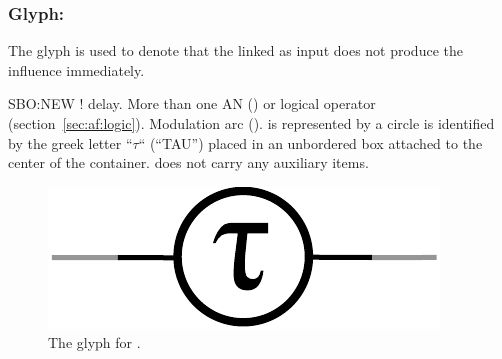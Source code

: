 \color{red}
\subsubsection{Glyph: }\label{sec:delay}

The glyph  is used to denote that the  linked as input does not produce the influence immediately.

\begin{glyphDescription}
 \glyphSboTerm SBO:NEW ! delay.
 \glyphOrigin More than one AN () or logical operator (section~\ref{sec:af:logic}).
 \glyphTarget  Modulation arc ().
 \glyphContainer {} is represented by a circle
 \glyphLabel {} is identified by the greek letter ``$\tau$`` (``TAU'') placed in an unbordered box attached to the center of the container.
 \glyphAux {} does not carry any auxiliary items.
\end{glyphDescription}

\begin{figure}[H]
  \centering
  \includegraphics[scale = 0.5]{images/delay}
  \caption{The \ER glyph for .}
  \label{fig:delay}
\end{figure}
\normalcolor
